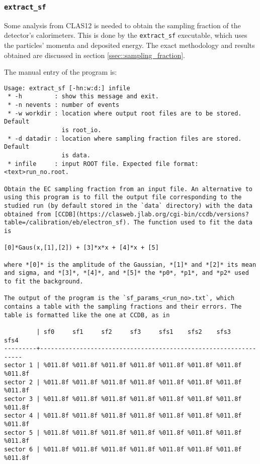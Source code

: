 \subsubsection{\texttt{extract\_sf}}
\label{sssec::extract_sf}
    Some analysis from CLAS12 is needed to obtain the sampling fraction of the detector's calorimeters.
    This is done by the \texttt{extract\_sf} executable, which uses the particles' momenta and deposited energy.
    The exact methodology and results obtained are discussed in section \ref{ssec::sampling_fraction}.

    The manual entry of the program is:
    \begin{lstlisting}
Usage: extract_sf [-hn:w:d:] infile
 * -h         : show this message and exit.
 * -n nevents : number of events
 * -w workdir : location where output root files are to be stored. Default
                is root_io.
 * -d datadir : location where sampling fraction files are stored. Default
                is data.
 * infile     : input ROOT file. Expected file format: <text>run_no.root.

Obtain the EC sampling fraction from an input file. An alternative to using this program is to fill the output file corresponding to the studied run (by default stored in the `data` directory) with the data obtained from [CCDB](https://clasweb.jlab.org/cgi-bin/ccdb/versions?table=/calibration/eb/electron_sf). The function used to fit the data is

[0]*Gaus(x,[1],[2]) + [3]*x*x + [4]*x + [5]

where *[0]* is the amplitude of the Gaussian, *[1]* and *[2]* its mean and sigma, and *[3]*, *[4]*, and *[5]* the *p0*, *p1*, and *p2* used to fit the background.

The output of the program is the `sf_params_<run_no>.txt`, which contains a table with the sampling fractions and their errors. The table is formatted like the one at CCDB, as in

         | sf0     sf1     sf2     sf3     sfs1    sfs2    sfs3    sfs4
---------+-----------------------------------------------------------------
sector 1 | %011.8f %011.8f %011.8f %011.8f %011.8f %011.8f %011.8f %011.8f
sector 2 | %011.8f %011.8f %011.8f %011.8f %011.8f %011.8f %011.8f %011.8f
sector 3 | %011.8f %011.8f %011.8f %011.8f %011.8f %011.8f %011.8f %011.8f
sector 4 | %011.8f %011.8f %011.8f %011.8f %011.8f %011.8f %011.8f %011.8f
sector 5 | %011.8f %011.8f %011.8f %011.8f %011.8f %011.8f %011.8f %011.8f
sector 6 | %011.8f %011.8f %011.8f %011.8f %011.8f %011.8f %011.8f %011.8f
    \end{lstlisting}
